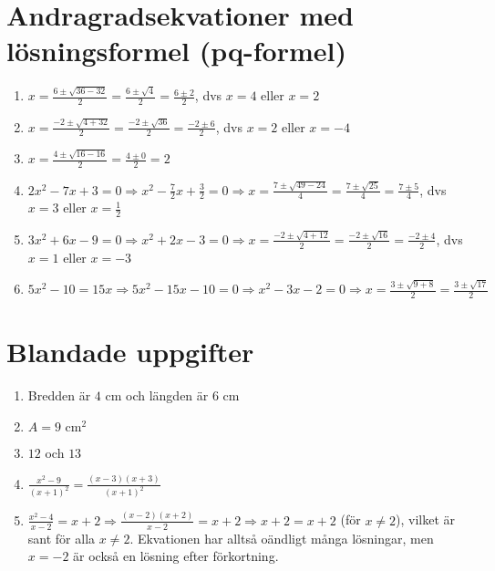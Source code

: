 \documentclass[a4paper,11pt]{article}
\begin{document}
\section{Andragradsekvationer med lösningsformel (pq-formel)}
\begin{enumerate}[label=\textbf{\arabic*.}]
    \item $x = \frac{6 \pm \sqrt{36-32}}{2} = \frac{6 \pm \sqrt{4}}{2} = \frac{6 \pm 2}{2}$, dvs $x = 4$ eller $x = 2$
    \item $x = \frac{-2 \pm \sqrt{4+32}}{2} = \frac{-2 \pm \sqrt{36}}{2} = \frac{-2 \pm 6}{2}$, dvs $x = 2$ eller $x = -4$
    \item $x = \frac{4 \pm \sqrt{16-16}}{2} = \frac{4 \pm 0}{2} = 2$
    \item $2x^2 - 7x + 3 = 0 \Rightarrow x^2 - \frac{7}{2}x + \frac{3}{2} = 0 \Rightarrow x = \frac{7 \pm \sqrt{49-24}}{4} = \frac{7 \pm \sqrt{25}}{4} = \frac{7 \pm 5}{4}$, dvs $x = 3$ eller $x = \frac{1}{2}$
    \item $3x^2 + 6x - 9 = 0 \Rightarrow x^2 + 2x - 3 = 0 \Rightarrow x = \frac{-2 \pm \sqrt{4+12}}{2} = \frac{-2 \pm \sqrt{16}}{2} = \frac{-2 \pm 4}{2}$, dvs $x = 1$ eller $x = -3$
    \item $5x^2 - 10 = 15x \Rightarrow 5x^2 - 15x - 10 = 0 \Rightarrow x^2 - 3x - 2 = 0 \Rightarrow x = \frac{3 \pm \sqrt{9+8}}{2} = \frac{3 \pm \sqrt{17}}{2}$
\end{enumerate}

\section{Blandade uppgifter}
\begin{enumerate}[label=\textbf{\arabic*.}]
    \item Bredden är $4\text{ cm}$ och längden är $6\text{ cm}$
    \item $A = 9\text{ cm}^2$
    \item $12$ och $13$
    \item $\frac{x^2-9}{(x+1)^2} = \frac{(x-3)(x+3)}{(x+1)^2}$
    \item $\frac{x^2-4}{x-2} = x+2 \Rightarrow \frac{(x-2)(x+2)}{x-2} = x+2 \Rightarrow x+2 = x+2$ (för $x \neq 2$), vilket är sant för alla $x \neq 2$. Ekvationen har alltså oändligt många lösningar, men $x = -2$ är också en lösning efter förkortning.
\end{enumerate}
\end{document}
